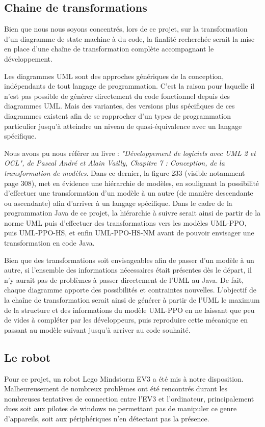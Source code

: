 \documentclass[french, 12pt, a4paper]{article}
\begin{document}
    
    \subsection{Chaine de transformations}
    Bien que nous nous soyons concentrés, lors de ce projet, sur la transformation d'un diagramme de state machine à du code, la finalité recherchée serait la mise en place d'une chaîne de transformation complète accompagnant le développement.
    
    Les diagrammes UML sont des approches génériques de la conception, indépendants de tout langage de programmation. C'est la raison pour laquelle il n'est pas possible de générer directement du code fonctionnel depuis des diagrammes UML. Mais des variantes, des versions plus spécifiques de ces diagrammes existent afin de se rapprocher d'un types de programmation particulier jusqu'à atteindre un niveau de quasi-équivalence avec un langage spécifique.
    
    Nous avons pu nous référer au livre :
    \textit{"Développement de logiciels avec UML 2 et OCL", de Pascal André et Alain Vailly, Chapitre 7 : Conception, de la transformation de modèles}. Dans ce dernier, la figure 233 (visible notamment page 308), met en évidence une hiérarchie de modèles, en soulignant la possibilité d'effectuer une transformation d'un modèle à un autre (de manière descendante ou ascendante) afin d'arriver à un langage spécifique. Dans le cadre de la programmation Java de ce projet, la hiérarchie à suivre serait ainsi de partir de la norme UML puis d'effectuer des transformations vers les modèles UML-PPO, puis UML-PPO-HS, et enfin UML-PPO-HS-NM avant de pouvoir envisager une transformation en code Java.
    
    Bien que des transformations soit envisageables afin de passer d'un modèle à un autre, si l'ensemble des informations nécessaires était présentes dès le départ, il n'y aurait pas de problèmes à passer directement de l'UML au Java. De fait, chaque diagramme apporte des possibilités et contraintes nouvelles. L'objectif de la chaîne de transformation serait ainsi de générer à partir de l'UML le maximum de la structure et des informations du modèle UML-PPO en ne laissant que peu de vides à compléter par les développeurs, puis reproduire cette mécanique en passant au modèle suivant jusqu'à arriver au code souhaité.
    
    
    \subsection{Le robot}
    Pour ce projet, un robot Lego Mindstorm EV3 a été mis à notre disposition.
    Malheureusement de nombreux problèmes ont été rencontrés durant les nombreuses tentatives de connection entre l'EV3 et l'ordinateur, principalement dues soit aux pilotes de windows ne permettant pas de manipuler ce genre d'appareils, soit aux périphériques n'en détectant pas la présence.
    
\end{document}
